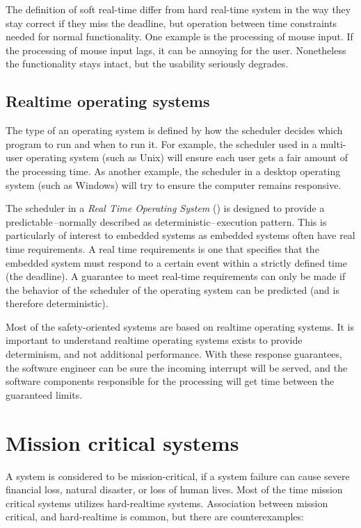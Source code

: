 The definition of soft real-time differ from hard real-time system in the way they stay correct if they miss the deadline, but operation between time constraints needed for normal functionality. One example is the processing of mouse input. If the processing of mouse input lags, it can be annoying for the user. Nonetheless the functionality stays intact, but the usability seriously degrades.

\subsection{Realtime operating systems}

The type of an operating system is defined by how the scheduler decides which program to run and when to run it. For example, the scheduler used in a multi-user operating system (such as Unix) will ensure each user gets a fair amount of the processing time. As another example, the scheduler in a desktop operating system (such as Windows) will try to ensure the computer remains responsive.

The scheduler in a \emph{Real Time Operating System} (\rtos) is designed to provide a predictable\,--normally described as deterministic--\,execution pattern. This is particularly of interest to embedded systems as embedded systems often have real time requirements. A real time requirements is one that specifies that the embedded system must respond to a certain event within a strictly defined time (the deadline). A guarantee to meet real-time requirements can only be made if the behavior of the scheduler of the operating system can be predicted (and is therefore deterministic).\citep{RTOS}

Most of the safety-oriented systems are based on realtime operating systems. It is important to understand realtime operating systems exists to provide determinism, and not additional performance. With these response guarantees, the software engineer can be sure the incoming interrupt will be served, and the software components responsible for the processing will get \cpu{} time between the guaranteed limits.

\section{Mission critical systems}
\label{sec:mission_critical_system}

A system is considered to be mission-critical, if a system failure can cause severe financial loss, natural disaster, or loss of human lives. Most of the time mission critical systems utilizes hard-realtime systems. Association between mission critical, and hard-realtime is common, but there are counterexamples:

